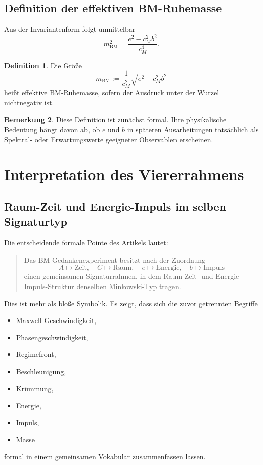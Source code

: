 \documentclass[11pt,a4paper]{article}
\theoremstyle{definition}
\newtheorem{definition}{Definition}[section]
\newtheorem{bemerkung}[definition]{Bemerkung}
\theoremstyle{plain}
\begin{document}
	\subsection{Definition der effektiven BM-Ruhemasse}
	
	Aus der Invariantenform folgt unmittelbar
	\[
	m_{\mathrm{BM}}^2 = \frac{e^2 - c_M^2 b^2}{c_M^4}.
	\]
	
	\begin{definition}
		Die Größe
		\[
		m_{\mathrm{BM}} := \frac{1}{c_M^2}\sqrt{e^2 - c_M^2 b^2}
		\]
		heißt effektive BM-Ruhemasse, sofern der Ausdruck unter der Wurzel nichtnegativ ist.
	\end{definition}
	
	\begin{bemerkung}
		Diese Definition ist zunächst formal. Ihre physikalische Bedeutung hängt davon ab, ob $e$ und $b$ in späteren Ausarbeitungen tatsächlich als Spektral- oder Erwartungswerte geeigneter Observablen erscheinen.
	\end{bemerkung}
	
	\section{Interpretation des Viererrahmens}
	
	\subsection{Raum-Zeit und Energie-Impuls im selben Signaturtyp}
	
	Die entscheidende formale Pointe des Artikels lautet:
	\begin{quote}
		Das BM-Gedankenexperiment besitzt nach der Zuordnung
		\[
		A\mapsto \text{Zeit},\quad C\mapsto \text{Raum},\quad e\mapsto \text{Energie},\quad b\mapsto \text{Impuls}
		\]
		einen gemeinsamen Signaturrahmen, in dem Raum-Zeit- und Energie-Impuls-Struktur denselben Minkowski-Typ tragen.
	\end{quote}
	
	Dies ist mehr als bloße Symbolik. Es zeigt, dass sich die zuvor getrennten Begriffe
	\begin{itemize}[leftmargin=2em]
		\item Maxwell-Geschwindigkeit,
		\item Phasengeschwindigkeit,
		\item Regimefront,
		\item Beschleunigung,
		\item Krümmung,
		\item Energie,
		\item Impuls,
		\item Masse
	\end{itemize}
	formal in einem gemeinsamen Vokabular zusammenfassen lassen.
	
\end{document}
